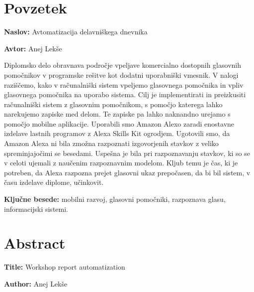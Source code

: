 \documentclass[a4paper, 12pt]{book}
\newcommand{\ttitle}{Avtomatizacija delavniškega dnevnika}
\newcommand{\ttitleEn}{Workshop report automatization}
\newcommand{\tauthor}{Anej Lekše}
\newcommand{\tkeywords}{mobilni razvoj, glasovni pomočniki, razpoznava glasu, informacijski sistemi}
\newcommand{\clearemptydoublepage}{\newpage{\pagestyle{empty}\cleardoublepage}}
\begin{document}
\chapter*{Povzetek}

\noindent\textbf{Naslov:} \ttitle
\bigskip

\noindent\textbf{Avtor:} \tauthor
\bigskip


\noindent Diplomsko delo obravnava področje vpeljave komercialno dostopnih glasovnih pomočnikov v programske rešitve kot dodatni uporabniški vmesnik.
V nalogi raziščemo, kako v računalniški sistem vpeljemo glasovnega pomočnika in vpliv glasovnega pomočnika na uporabo sistema.
Cilj je implementirati in preizkusiti računalniški sistem z glasovnim pomočnikom, s pomočjo katerega lahko narekujemo zapiske med delom. 
Te zapiske pa lahko naknandno urejamo s pomočjo mobilne aplikacije.
Uporabili smo Amazon Alexo zaradi enostavne izdelave lastnih programov z Alexa Skills Kit ogrodjem.
Ugotovili smo, da Amazon Alexa ni bila zmožna razpoznati izgovorjenih stavkov z veliko spreminjajočimi se besedami.
Uspešna je bila pri razpoznavanju stavkov, ki so se v celoti ujemali z naučenim razpoznavnim modelom.
Kljub temu je čas, ki je potreben, da Alexa razpozna prejet glasovni ukaz prepočasen, da bi bil sistem, v času izdelave diplome, učinkovit.
\bigskip

\noindent\textbf{Ključne besede:} \tkeywords.
\clearemptydoublepage

\chapter*{Abstract}

\noindent\textbf{Title:} \ttitleEn
\bigskip

\noindent\textbf{Author:} \tauthor
\bigskip
\end{document}
